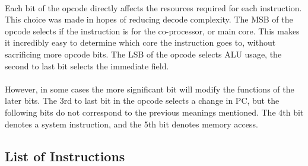 \documentclass[letterpaper, 11pt]{article}
\begin{document}
\paragraph{} Each bit of the opcode directly affects the resources required for each instruction. This choice was made 
in hopes of reducing decode complexity. The MSB of the opcode selects if the instruction is for the co-processor,
or main core. This makes it incredibly easy to determine which core the instruction goes to, without sacrificing
more opcode bits. The LSB of the opcode selects ALU usage, the second to last bit selects the immediate field.
\paragraph{} However, in some cases the more significant bit will modify the functions of the later bits. The 3rd to last
bit in the opcode selects a change in PC, but the following bits do not correspond to the previous meanings mentioned. The
4th bit denotes a system instruction, and the 5th bit denotes memory access. 
\newpage


\subsection{List of Instructions}
\end{document}
